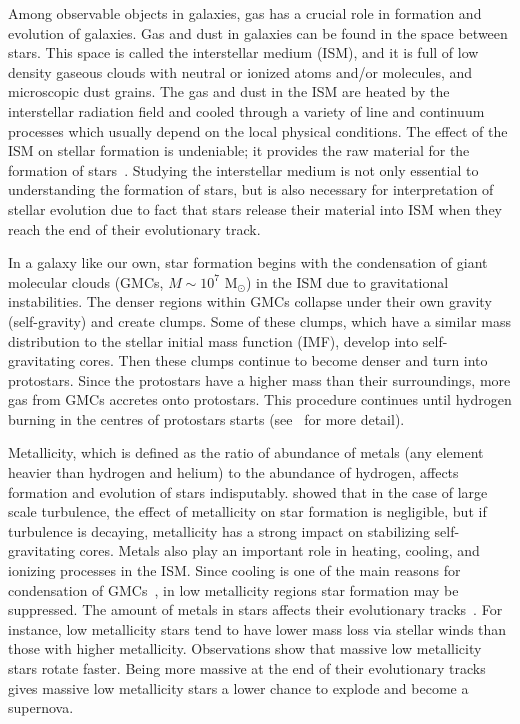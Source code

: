 Among observable objects in galaxies, gas has a crucial role in formation and evolution of galaxies.
Gas and dust in galaxies can be found in the space between stars.
This space is called the interstellar medium (ISM), and it is full of low density gaseous clouds with neutral or ionized atoms and/or molecules, and microscopic dust grains.
The gas and dust in the ISM are heated by the interstellar radiation field and cooled through a variety of line and continuum processes which usually depend on the local physical conditions. 
The effect of the ISM on stellar formation is undeniable; it provides the raw material for the formation of stars~\citep[e.g.][]{Kennicutt08,Bigiel08}.
Studying the interstellar medium is not only essential to understanding the formation of stars, but is also  necessary for interpretation of stellar evolution due to fact that stars release their material into ISM when they reach the end of their evolutionary track.

In a galaxy like our own, star formation begins with the condensation of giant molecular clouds (GMCs, $M \sim 10^7$ M$_{\odot}$) in the ISM due to gravitational instabilities. 
The denser regions within GMCs collapse under their own gravity (self-gravity) and create clumps.
Some of these clumps, which have a similar mass distribution to the stellar initial mass function (IMF), develop into self-gravitating cores.
Then these clumps continue to become denser and turn into protostars. 
Since the protostars have a higher mass than their surroundings, more gas from GMCs accretes onto protostars.
This procedure continues until hydrogen burning in the centres of protostars starts (see~\cite{McKee07} for more detail). 

Metallicity, which is defined as the ratio of abundance of metals (any element heavier than hydrogen and helium) to the abundance of hydrogen, affects formation and evolution of stars indisputably.
\cite{Walch11} showed that in the case of large scale turbulence, the effect of metallicity on star formation is negligible, but if turbulence is decaying,  metallicity has a strong impact on stabilizing self-gravitating cores.
Metals also play an important role in heating, cooling, and ionizing processes in the ISM.
Since cooling is one of the main reasons for condensation of GMCs~\citep[e.g.][]{Maio07}, in low metallicity regions star formation may be suppressed. 
The amount of metals in stars affects their evolutionary tracks~\citep[e.g.][and references therein]{Maeder02}.
For instance, low metallicity stars tend to have lower mass loss via stellar winds than those with higher metallicity.
Observations show that massive low metallicity stars rotate faster.
Being more massive at the end of their evolutionary tracks gives massive low metallicity stars a lower chance to explode and become a supernova.


